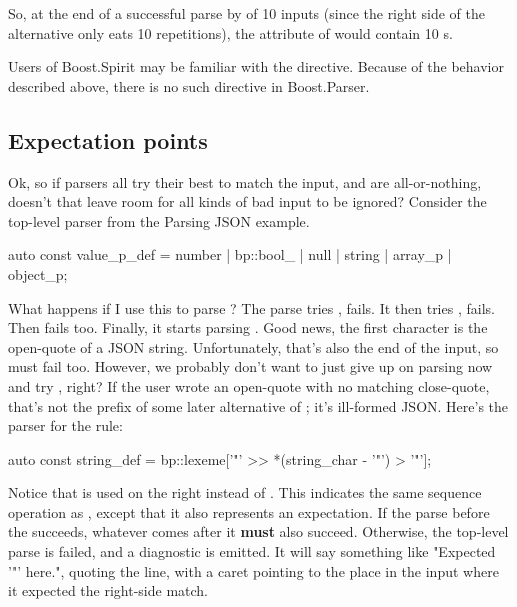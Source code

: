\documentclass{MyBook}
\begin{document}
So, at the end of a successful parse by  of 10 inputs (since the right side of the alternative only eats 10 repetitions), the  attribute of  would contain 10 s.

\begin{marker}[title=Note ]
Users of Boost.Spirit may be familiar with the  directive. Because of the behavior described above, there is no such directive in Boost.Parser. 
\end{marker}

\subsection{Expectation points}

Ok, so if parsers all try their best to match the input, and are all-or-nothing, doesn't that leave room for all kinds of bad input to be ignored? Consider the top-level parser from the Parsing JSON example.

\begin{code}
auto const value_p_def =
    number | bp::bool_ | null | string | array_p | object_p;
\end{code}

What happens if I use this to parse ? The parse tries , fails. It then tries , fails. Then  fails too. Finally, it starts parsing . Good news, the first character is the open-quote of a JSON string. Unfortunately, that's also the end of the input, so  must fail too. However, we probably don't want to just give up on parsing  now and try , right? If the user wrote an open-quote with no matching close-quote, that's not the prefix of some later alternative of ; it's ill-formed JSON. Here's the parser for the  rule:

\begin{code}
auto const string_def = bp::lexeme['"' >> *(string_char - '"') > '"'];
\end{code}

Notice that  is used on the right instead of . This indicates the same sequence operation as , except that it also represents an expectation. If the parse before the  succeeds, whatever comes after it \textbf{must} also succeed. Otherwise, the top-level parse is failed, and a diagnostic is emitted. It will say something like "Expected '"'{} here.", quoting the line, with a caret pointing to the place in the input where it expected the right-side match.
\end{document}
